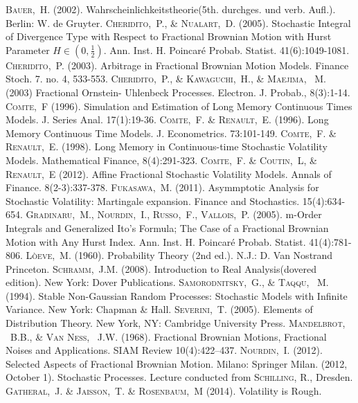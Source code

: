 \documentclass[a4paper, twoside, 11pt]{article}
\theoremstyle{definition}
\begin{document}
\newpage



\begin{thebibliography}{99}
	 \textsc{Bauer,~H.} (2002). Wahrscheinlichkeitstheorie(5th. durchges. und verb. Aufl.). Berlin: W. de Gruyter.
	 \textsc{Cheridito,~P., \& Nualart,~D.} (2005). Stochastic Integral of Divergence Type with Respect to Fractional Brownian Motion with Hurst Parameter $H \in(0, \frac{1}{2})$. Ann. Inst. H. Poincar\'e Probab. Statist. 41(6):1049-1081. 
	 \textsc{Cheridito,~P.} (2003). Arbitrage in Fractional Brownian Motion Models. Finance Stoch. 7. no. 4, 533-553.
	 \textsc{Cheridito,~P., \& Kawaguchi,~H., \& Maejima, ~M.} (2003) Fractional Ornstein- Uhlenbeck Processes. Electron. J. Probab., 8(3):1-14.
	 \textsc{Comte,~F} (1996). Simulation and Estimation of Long Memory Continuous Times Models. J. Series Anal. 17(1):19-36.
	 \textsc{Comte,~F. \& Renault,~E.} (1996). Long Memory Continuous Time Models. J. Econometrics. 73:101-149.
	 \textsc{Comte,~F. \& Renault,~E.} (1998). Long Memory in Continuous-time Stochastic Volatility Models. Mathematical Finance, 8(4):291-323.
	   \textsc{Comte,~F. \& Coutin,~L, \& Renault,~E} (2012). Affine Fractional Stochastic Volatility Models. Annals of Finance. 8(2-3):337-378.
	   \textsc{Fukasawa,~M.} (2011). Asymmptotic Analysis for Stochastic Volatility: Martingale expansion. Finance and Stochastics. 15(4):634-654.
	 \textsc{Gradinaru,~M., Nourdin,~I., Russo,~F., Vallois,~P.} (2005). m-Order Integrals and Generalized Ito's Formula; The Case of a Fractional Brownian Motion with Any Hurst Index. Ann. Inst. H. Poincar\'e Probab. Statist. 41(4):781-806. 
	 \textsc{L\`oeve,~M.} (1960). Probability Theory (2nd ed.). N.J.: D. Van Nostrand Princeton.
	 \textsc{Schramm,~J.M.} (2008). Introduction to Real Analysis(dovered edition). New York: Dover Publications.
	 \textsc{Samorodnitsky,~G., \& Taqqu, ~M.} (1994). Stable Non-Gaussian Random Processes: Stochastic Models with Infinite Variance. New York: Chapman \& Hall.
	\textsc{Severini,~T.} (2005). Elements of Distribution Theory. New York, NY: Cambridge University Press.
	 \textsc{Mandelbrot, ~B.B., \& Van Ness, ~J.W.} (1968). Fractional Brownian Motions, Fractional Noises and Applications. SIAM Review 10(4):422–437.
	 \textsc{Nourdin,~I.} (2012). Selected Aspects of Fractional Brownian Motion. Milano: Springer Milan.
	 (2012, October 1). Stochastic Processes. Lecture conducted from \textsc{Schilling, R.}, Dresden.
	 \textsc{Gatheral,~J. \& Jaisson,~T. \& Rosenbaum,~M} (2014). Volatility is Rough.
\end{thebibliography}
\end{document}
